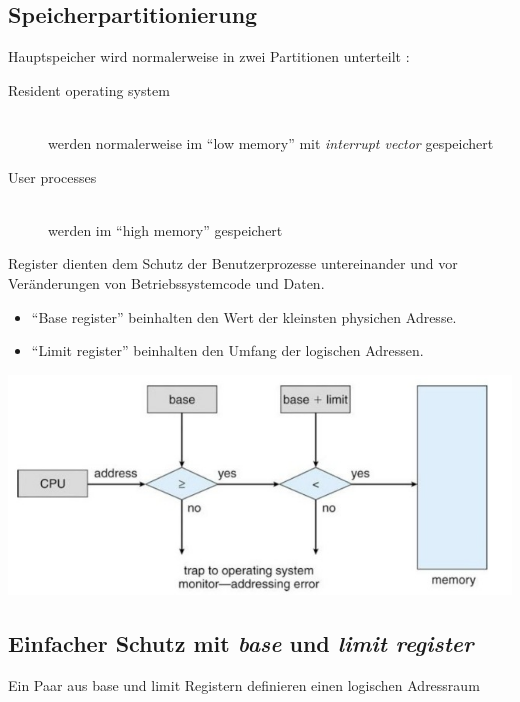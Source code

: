 \documentclass[a4paper]{scrreprt}
\begin{document}
\subsection{Speicherpartitionierung}

Hauptspeicher wird normalerweise in zwei Partitionen unterteilt :
\begin{description}
\item[Resident operating system]\ \\ werden normalerweise im "`low memory"' mit  \textit{interrupt vector} gespeichert
\item[User processes]\ \\werden im "`high memory"' gespeichert
\end{description}

Register dienten dem Schutz der Benutzerprozesse untereinander und vor Veränderungen von Betriebssystemcode und Daten.
\begin{itemize}
\item "`Base register"' beinhalten den Wert der kleinsten physichen Adresse.
\item "`Limit register"' beinhalten den Umfang der logischen Adressen.
\end{itemize}

\begin{center}
		\includegraphics[scale=0.5]{graphics/baseandlimit.png}
\end{center}

\subsection{Einfacher Schutz mit \textit{base} und \textit{limit register}}

Ein Paar aus base und limit Registern definieren einen logischen Adressraum
\end{document}

